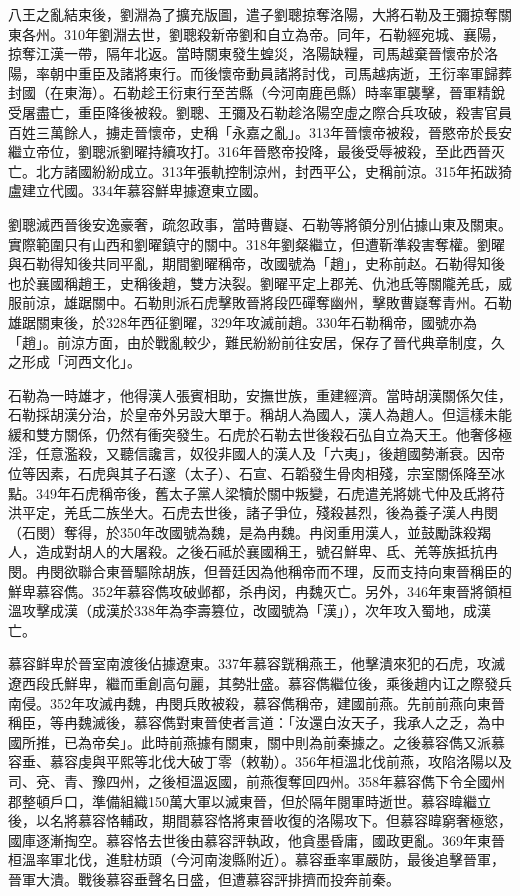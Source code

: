 八王之亂結束後，劉淵為了擴充版圖，遣子劉聰掠奪洛陽，大將石勒及王彌掠奪關東各州。310年劉淵去世，劉聰殺新帝劉和自立為帝。同年，石勒經宛城、襄陽，掠奪江漢一帶，隔年北返。當時關東發生蝗災，洛陽缺糧，司馬越棄晉懷帝於洛陽，率朝中重臣及諸將東行。而後懷帝動員諸將討伐，司馬越病逝，王衍率軍歸葬封國（在東海）。石勒趁王衍東行至苦縣（今河南鹿邑縣）時率軍襲擊，晉軍精銳受屠盡亡，重臣降後被殺。劉聰、王彌及石勒趁洛陽空虛之際合兵攻破，殺害官員百姓三萬餘人，擄走晉懷帝，史稱「永嘉之亂」。313年晉懷帝被殺，晉愍帝於長安繼立帝位，劉聰派劉曜持續攻打。316年晉愍帝投降，最後受辱被殺，至此西晉灭亡。北方諸國紛紛成立。313年張軌控制涼州，封西平公，史稱前涼。315年拓跋猗盧建立代國。334年慕容鮮卑據遼東立國。

劉聰滅西晉後安逸豪奢，疏忽政事，當時曹嶷、石勒等將領分別佔據山東及關東。實際範圍只有山西和劉曜鎮守的關中。318年劉粲繼立，但遭靳準殺害奪權。劉曜與石勒得知後共同平亂，期間劉曜稱帝，改國號為「趙」，史称前赵。石勒得知後也於襄國稱趙王，史稱後趙，雙方決裂。劉曜平定上郡羌、仇池氐等關隴羌氐，威服前涼，雄踞關中。石勒則派石虎擊敗晉將段匹磾奪幽州，擊敗曹嶷奪青州。石勒雄踞關東後，於328年西征劉曜，329年攻滅前趙。330年石勒稱帝，國號亦為「趙」。前涼方面，由於戰亂較少，難民紛紛前往安居，保存了晉代典章制度，久之形成「河西文化」。

石勒為一時雄才，他得漢人張賓相助，安撫世族，重建經濟。當時胡漢關係欠佳，石勒採胡漢分治，於皇帝外另設大單于。稱胡人為國人，漢人為趙人。但這樣未能緩和雙方關係，仍然有衝突發生。石虎於石勒去世後殺石弘自立為天王。他奢侈極淫，任意濫殺，又聽信讒言，奴役非國人的漢人及「六夷」，後趙國勢漸衰。因帝位等因素，石虎與其子石邃（太子）、石宣、石韜發生骨肉相殘，宗室關係降至冰點。349年石虎稱帝後，舊太子黨人梁犢於關中叛變，石虎遣羌將姚弋仲及氐將苻洪平定，羌氐二族坐大。石虎去世後，諸子爭位，殘殺甚烈，後為養子漢人冉閔（石閔）奪得，於350年改國號為魏，是為冉魏。冉闵重用漢人，並鼓勵誅殺羯人，造成對胡人的大屠殺。之後石祗於襄國稱王，號召鮮卑、氐、羌等族抵抗冉閔。冉閔欲聯合東晉驅除胡族，但晉廷因為他稱帝而不理，反而支持向東晉稱臣的鮮卑慕容儁。352年慕容儁攻破邺都，杀冉闵，冉魏灭亡。另外，346年東晉將領桓溫攻擊成漢（成漢於338年為李壽篡位，改國號為「漢」），次年攻入蜀地，成漢亡。

慕容鲜卑於晉室南渡後佔據遼東。337年慕容皝稱燕王，他擊潰來犯的石虎，攻滅遼西段氏鮮卑，繼而重創高句麗，其勢壯盛。慕容儁繼位後，乘後趙内讧之際發兵南侵。352年攻滅冉魏，冉閔兵敗被殺，慕容儁稱帝，建國前燕。先前前燕向東晉稱臣，等冉魏滅後，慕容儁對東晉使者言道：「汝還白汝天子，我承人之乏，為中國所推，已為帝矣」。此時前燕據有關東，關中則為前秦據之。之後慕容儁又派慕容垂、慕容虔與平熙等北伐大破丁零（敕勒）。356年桓溫北伐前燕，攻陷洛陽以及司、兗、青、豫四州，之後桓溫返國，前燕復奪回四州。358年慕容儁下令全國州郡整頓戶口，準備組織150萬大軍以滅東晉，但於隔年閱軍時逝世。慕容暐繼立後，以名將慕容恪輔政，期間慕容恪將東晉收復的洛陽攻下。但慕容暐窮奢極慾，國庫逐漸掏空。慕容恪去世後由慕容評執政，他貪墨昏庸，國政更亂。369年東晉桓溫率軍北伐，進駐枋頭（今河南浚縣附近）。慕容垂率軍嚴防，最後追擊晉軍，晉軍大潰。戰後慕容垂聲名日盛，但遭慕容評排擠而投奔前秦。


